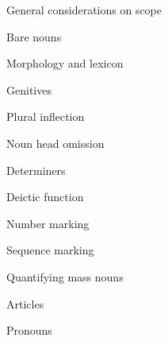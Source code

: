 \setcounter{listWWNumviiileveli}{4}
\begin{listWWNumviiileveli}
\item 

\setcounter{listWWNumviiilevelii}{0}
\begin{listWWNumviiilevelii}
\item 
\begin{styleListParagraph}
General considerations on scope 
\end{styleListParagraph}
\item 
\begin{styleListParagraph}
Bare nouns 
\end{styleListParagraph}


\setcounter{listWWNumviiileveliii}{0}
\begin{listWWNumviiileveliii}
\item 
\begin{styleListParagraph}
Morphology and lexicon
\end{styleListParagraph}
\item 
\begin{styleListParagraph}
Genitives 
\end{styleListParagraph}
\item 
\begin{styleListParagraph}
Plural inflection 
\end{styleListParagraph}
\item 
\begin{styleListParagraph}
Noun head omission
\end{styleListParagraph}
\end{listWWNumviiileveliii}
\item 
\begin{styleListParagraph}
Determiners
\end{styleListParagraph}


\setcounter{listWWNumviiileveliii}{0}
\begin{listWWNumviiileveliii}
\item 
\begin{styleListParagraph}
Deictic function
\end{styleListParagraph}
\item 
\begin{styleListParagraph}
Number marking
\end{styleListParagraph}
\item 
\begin{styleListParagraph}
Sequence marking 
\end{styleListParagraph}
\item 
\begin{styleListParagraph}
Quantifying mass nouns 
\end{styleListParagraph}
\item 
\begin{styleListParagraph}
Articles 
\end{styleListParagraph}
\end{listWWNumviiileveliii}
\item 
\begin{styleListParagraph}
Pronouns
\end{styleListParagraph}



\end{listWWNumviiilevelii}
\end{listWWNumviiileveli}

